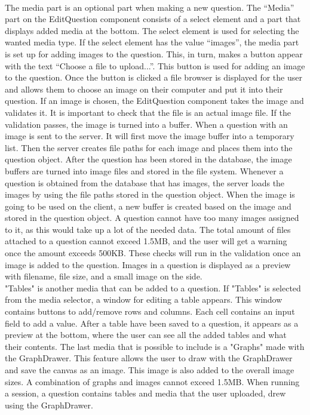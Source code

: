 \\[11pt]
The media part is an optional part when making a new question. The “Media” part on the EditQuestion component consists of a select element and a part that displays added media at the bottom. The select element is used for selecting the wanted media type. If the select element has the value “images”, the media part is set up for adding images to the question. This, in turn, makes a button appear with the text “Choose a file to upload...”. This button is used for adding an image to the question. Once the button is clicked a file browser is displayed for the user and allows them to choose an image on their computer and put it into their question. If an image is chosen, the EditQuestion component takes the image and validates it. It is important to check that the file is an actual image file. If the validation passes, the image is turned into a buffer. When a question with an image is sent to the server. It will first move the image buffer into a temporary list. Then the server creates file paths for each image and places them into the question object. After the question has been stored in the database, the image buffers are turned into image files and stored in the file system. Whenever a question is obtained from the database that has images, the server loads the images by using the file paths stored in the question object. When the image is going to be used on the client, a new buffer is created based on the image and stored in the question object. A question cannot have too many images assigned to it, as this would take up a lot of the needed data. The total amount of files attached to a question cannot exceed 1.5MB, and the user will get a warning once the amount exceeds 500KB. These checks will run in the validation once an image is added to the question. Images in a question is displayed as a preview with filename, file size, and a small image on the side.
\\[11pt]
"Tables" is another media that can be added to a question. If "Tables" is selected from the media selector, a window for editing a table appears. This window contains buttons to add/remove rows and columns. Each cell contains an input field to add a value. After a table have been saved to a question, it appears as a preview at the bottom, where the user can see all the added tables and what their contents. The last media that is possible to include is a "Graphs" made with the GraphDrawer. This feature allows the user to draw with the GraphDrawer and save the canvas as an image. This image is also added to the overall image sizes. A combination of graphs and images cannot exceed 1.5MB. When running a session, a question contains tables and media that the user uploaded, drew using the GraphDrawer.
